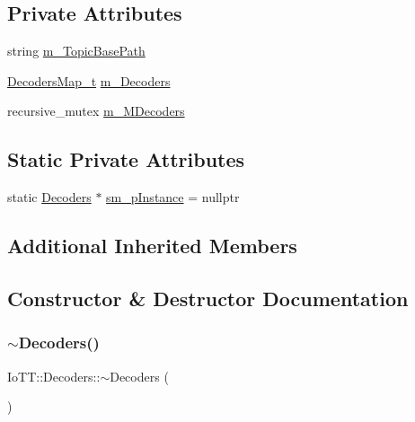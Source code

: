\subsection*{Private Attributes}
\begin{DoxyCompactItemize}
\item 
string \hyperlink{classIoTT_1_1Decoders_a5fa7217ac2674eec1be09eb9c9ca36af}{m\+\_\+\+Topic\+Base\+Path}
\item 
\hyperlink{namespaceIoTT_a677ecaa41dfd1a0a7987bda3d12720f4}{Decoders\+Map\+\_\+t} \hyperlink{classIoTT_1_1Decoders_afa68af31e406b2de6877715f16d6833f}{m\+\_\+\+Decoders}
\item 
recursive\+\_\+mutex \hyperlink{classIoTT_1_1Decoders_a825e74476dd0c449bdf7c396d67e19ba}{m\+\_\+\+M\+Decoders}
\end{DoxyCompactItemize}
\subsection*{Static Private Attributes}
\begin{DoxyCompactItemize}
\item 
static \hyperlink{classIoTT_1_1Decoders}{Decoders} $\ast$ \hyperlink{classIoTT_1_1Decoders_a760a108a879e32459261f7ab355b7251}{sm\+\_\+p\+Instance} = nullptr
\end{DoxyCompactItemize}
\subsection*{Additional Inherited Members}


\subsection{Constructor \& Destructor Documentation}
\mbox{\label{classIoTT_1_1Decoders_a101b619ed4cfa0fb6ff19984e534161f}} 
\subsubsection{\texorpdfstring{$\sim$\+Decoders()}{~Decoders()}}
{\footnotesize\ttfamily Io\+T\+T\+::\+Decoders\+::$\sim$\+Decoders (\begin{DoxyParamCaption}{ }\end{DoxyParamCaption})\hspace{0.3cm}{\ttfamily [virtual]}}

